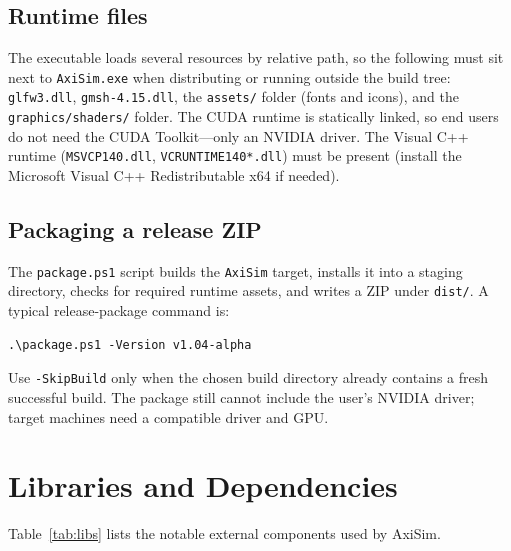 \documentclass[11pt]{article}
\begin{document}
\subsection{Runtime files}
The executable loads several resources by relative path, so the following must sit
next to \texttt{AxiSim.exe} when distributing or running outside the build tree:
\texttt{glfw3.dll}, \texttt{gmsh-4.15.dll}, the \texttt{assets/} folder (fonts and
icons), and the \texttt{graphics/shaders/} folder. The CUDA runtime is statically
linked, so end users do not need the CUDA Toolkit---only an NVIDIA driver. The Visual
C++ runtime (\texttt{MSVCP140.dll}, \texttt{VCRUNTIME140*.dll}) must be present (install
the Microsoft Visual C++ Redistributable x64 if needed).

\subsection{Packaging a release ZIP}
The \texttt{package.ps1} script builds the \texttt{AxiSim} target, installs it into a
staging directory, checks for required runtime assets, and writes a ZIP under
\texttt{dist/}. A typical release-package command is:
\begin{lstlisting}[language={}]
.\package.ps1 -Version v1.04-alpha
\end{lstlisting}
Use \texttt{-SkipBuild} only when the chosen build directory already contains a fresh
successful build. The package still cannot include the user's NVIDIA driver; target
machines need a compatible driver and GPU.

\section{Libraries and Dependencies}\label{sec:libraries}
Table~\ref{tab:libs} lists the notable external components used by AxiSim.
\end{document}
